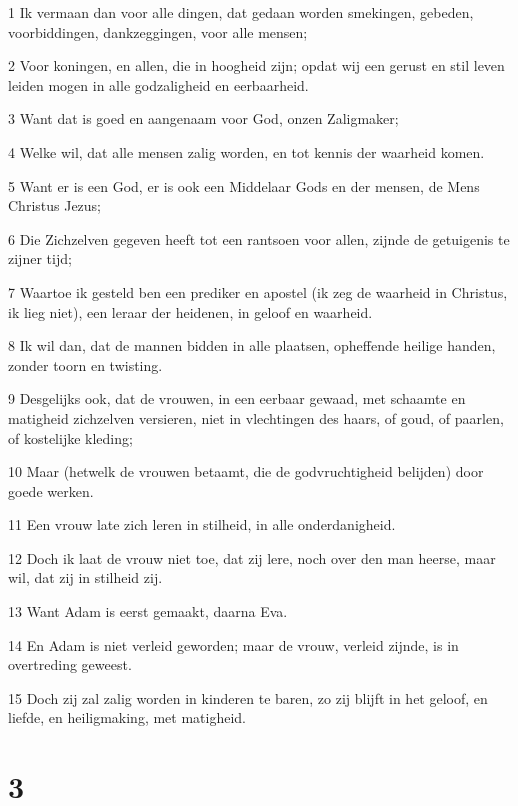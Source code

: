\par 1 Ik vermaan dan voor alle dingen, dat gedaan worden smekingen, gebeden, voorbiddingen, dankzeggingen, voor alle mensen;
\par 2 Voor koningen, en allen, die in hoogheid zijn; opdat wij een gerust en stil leven leiden mogen in alle godzaligheid en eerbaarheid.
\par 3 Want dat is goed en aangenaam voor God, onzen Zaligmaker;
\par 4 Welke wil, dat alle mensen zalig worden, en tot kennis der waarheid komen.
\par 5 Want er is een God, er is ook een Middelaar Gods en der mensen, de Mens Christus Jezus;
\par 6 Die Zichzelven gegeven heeft tot een rantsoen voor allen, zijnde de getuigenis te zijner tijd;
\par 7 Waartoe ik gesteld ben een prediker en apostel (ik zeg de waarheid in Christus, ik lieg niet), een leraar der heidenen, in geloof en waarheid.
\par 8 Ik wil dan, dat de mannen bidden in alle plaatsen, opheffende heilige handen, zonder toorn en twisting.
\par 9 Desgelijks ook, dat de vrouwen, in een eerbaar gewaad, met schaamte en matigheid zichzelven versieren, niet in vlechtingen des haars, of goud, of paarlen, of kostelijke kleding;
\par 10 Maar (hetwelk de vrouwen betaamt, die de godvruchtigheid belijden) door goede werken.
\par 11 Een vrouw late zich leren in stilheid, in alle onderdanigheid.
\par 12 Doch ik laat de vrouw niet toe, dat zij lere, noch over den man heerse, maar wil, dat zij in stilheid zij.
\par 13 Want Adam is eerst gemaakt, daarna Eva.
\par 14 En Adam is niet verleid geworden; maar de vrouw, verleid zijnde, is in overtreding geweest.
\par 15 Doch zij zal zalig worden in kinderen te baren, zo zij blijft in het geloof, en liefde, en heiligmaking, met matigheid.

\chapter{3}


